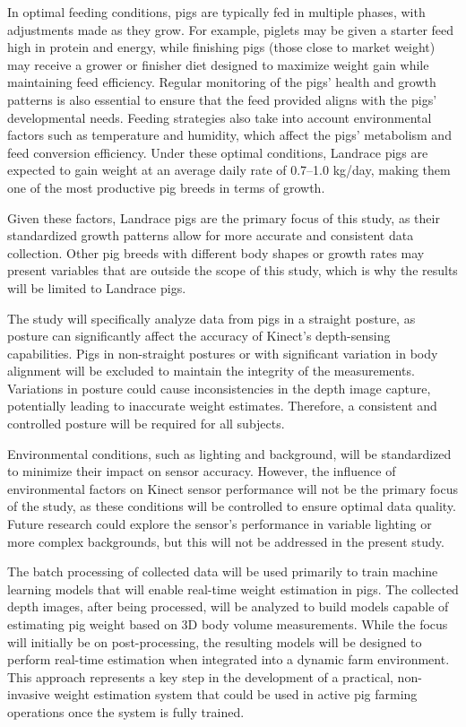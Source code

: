 {In optimal feeding conditions, pigs are typically fed in multiple phases, with adjustments made as they grow. For example, piglets may be given a starter feed high in protein and energy, while finishing pigs (those close to market weight) may receive a grower or finisher diet designed to maximize weight gain while maintaining feed efficiency. Regular monitoring of the pigs' health and growth patterns is also essential to ensure that the feed provided aligns with the pigs' developmental needs. Feeding strategies also take into account environmental factors such as temperature and humidity, which affect the pigs' metabolism and feed conversion efficiency. Under these optimal conditions, Landrace pigs are expected to gain weight at an average daily rate of 0.7–1.0 kg/day, making them one of the most productive pig breeds in terms of growth.

Given these factors, Landrace pigs are the primary focus of this study, as their standardized growth patterns allow for more accurate and consistent data collection. Other pig breeds with different body shapes or growth rates may present variables that are outside the scope of this study, which is why the results will be limited to Landrace pigs.

The study will specifically analyze data from pigs in a straight posture, as posture can significantly affect the accuracy of Kinect’s depth-sensing capabilities. Pigs in non-straight postures or with significant variation in body alignment will be excluded to maintain the integrity of the measurements. Variations in posture could cause inconsistencies in the depth image capture, potentially leading to inaccurate weight estimates. Therefore, a consistent and controlled posture will be required for all subjects.

Environmental conditions, such as lighting and background, will be standardized to minimize their impact on sensor accuracy. However, the influence of environmental factors on Kinect sensor performance will not be the primary focus of the study, as these conditions will be controlled to ensure optimal data quality. Future research could explore the sensor's performance in variable lighting or more complex backgrounds, but this will not be addressed in the present study.

The batch processing of collected data will be used primarily to train machine learning models that will enable real-time weight estimation in pigs. The collected depth images, after being processed, will be analyzed to build models capable of estimating pig weight based on 3D body volume measurements. While the focus will initially be on post-processing, the resulting models will be designed to perform real-time estimation when integrated into a dynamic farm environment. This approach represents a key step in the development of a practical, non-invasive weight estimation system that could be used in active pig farming operations once the system is fully trained.



}
